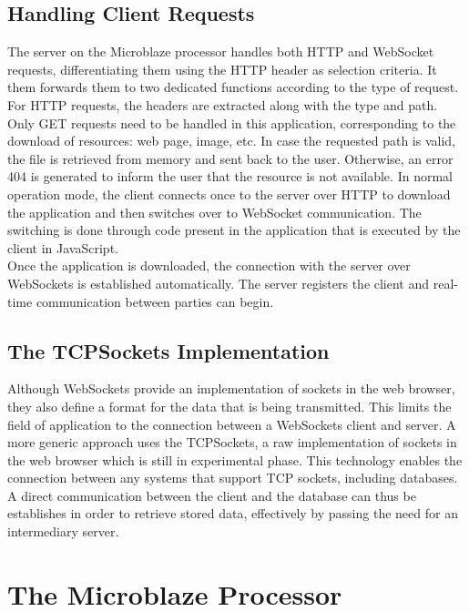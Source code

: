     \subsection{Handling Client Requests}

      The server on the Microblaze processor handles both HTTP and WebSocket requests, differentiating them using the HTTP header as selection criteria. It them forwards them to two dedicated functions according to the type of request. \\

      For HTTP requests, the headers are extracted along with the type and path. Only GET requests need to be handled in this application, corresponding to the download of resources: web page, image, etc. In case the requested path is valid, the file is retrieved from memory and sent back to the user. Otherwise, an error 404 is generated to inform the user that the resource is not available. In normal operation mode, the client connects once to the server over HTTP to download the application and then switches over to WebSocket communication. The switching is done through code present in the application that is executed by the client in JavaScript. \\

      Once the application is downloaded, the connection with the server over WebSockets is established automatically. The server registers the client and real-time communication between parties can begin.

    \subsection{The TCPSockets Implementation}

      Although WebSockets provide an implementation of sockets in the web browser, they also define a format for the data that is being transmitted. This limits the field of application to the connection between a WebSockets client and server. A more generic approach uses the TCPSockets, a raw implementation of sockets in the web browser which is still in experimental phase. This technology enables the connection between any systems that support TCP sockets, including databases. A direct communication between the client and the database can thus be establishes in order to retrieve stored data, effectively by passing the need for an intermediary server.

  \section{The Microblaze Processor}


